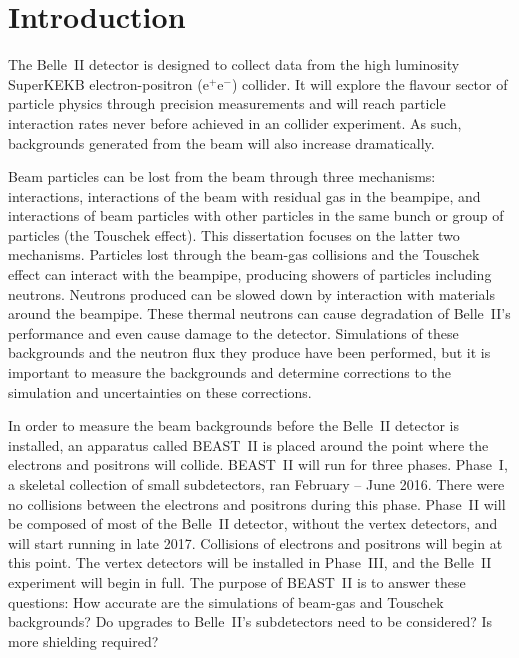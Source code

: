 \chapter{Introduction}
\label{chap:Intro}

The Belle~II detector is designed to collect data from the high luminosity SuperKEKB electron-positron (e$^+$e$^-$) collider. It will explore the flavour sector of particle physics through precision measurements and will reach particle interaction rates never before achieved in an \epem collider experiment. As such, backgrounds generated from the beam will also increase dramatically. 


Beam particles can be lost from the beam through three mechanisms: \epem interactions, interactions of the beam with residual gas in the beampipe, and interactions of beam particles with other particles in the same bunch or group of particles (the Touschek effect). This dissertation focuses on the latter two mechanisms. Particles lost through the beam-gas collisions and the Touschek effect can interact with the beampipe, producing showers of particles including neutrons. Neutrons produced can be slowed down by interaction with materials around the beampipe. These thermal neutrons can cause degradation of Belle~II's performance and even cause damage to the detector. Simulations of these backgrounds and the neutron flux they produce have been performed, but it is important to measure the backgrounds and determine corrections to the simulation and uncertainties on these corrections.




In order to measure the beam backgrounds before the Belle~II detector is installed, an apparatus called BEAST~II is placed around the point where the electrons and positrons will collide. BEAST~II will run for three phases. Phase~I, a skeletal collection of small subdetectors, ran February -- June 2016. There were no collisions between the electrons and positrons during this phase.  Phase~II will be composed of most of the Belle~II detector, without the vertex detectors, and will start running in late 2017. Collisions of electrons and positrons will begin at this point. The vertex detectors will be installed in Phase~III, and the Belle~II experiment will begin in full. The purpose of BEAST~II is to answer these questions: How accurate are the simulations of beam-gas and Touschek backgrounds? Do upgrades to Belle~II's subdetectors need to be considered? Is more shielding required?




